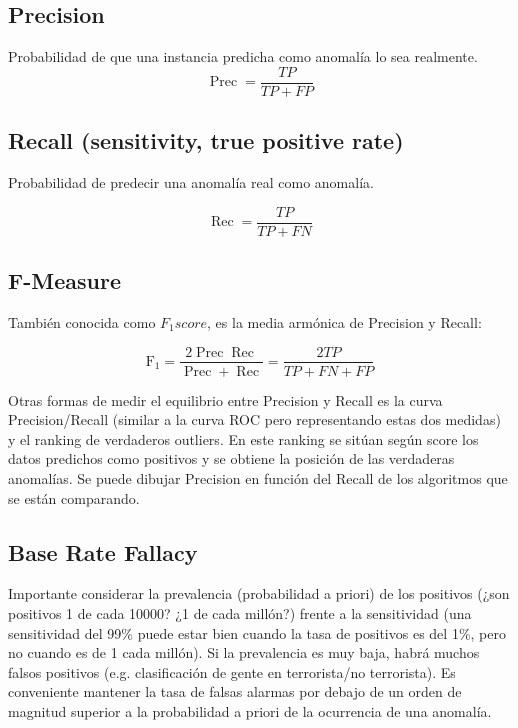 \documentclass[a4paper,11pt,spanish]{report}
\let\stdsub\subsection
\let\stdsubsub\subsubsection
\renewcommand{\section}{\stdsub}
\renewcommand{\subsection}{\stdsubsub}
\begin{document}
\section{Precision}
\label{sec-2-5-1}

Probabilidad de que una instancia predicha como anomalía lo sea realmente.
$$\operatorname{Prec}=\frac{TP}{TP+FP}$$

\section{Recall (sensitivity, true positive rate)}
\label{sec-2-5-2}

Probabilidad de predecir una anomalía real como anomalía.

$$\operatorname{Rec}=\frac{TP}{TP + FN}$$

\section{F-Measure}
\label{sec-2-5-3}

También conocida como $F_1 score$, es la media armónica de Precision y Recall:

$$\operatorname{F_1}=\frac{2 \operatorname{Prec} \operatorname{Rec}}{\operatorname{Prec} +\operatorname{Rec}} = \frac{2 TP}{TP + FN + FP}$$

Otras formas de medir el equilibrio entre Precision y Recall es la curva Precision/Recall (similar a la curva ROC pero representando estas dos medidas) y el ranking de verdaderos outliers. En este ranking se sitúan según score los datos predichos como positivos y se obtiene la posición de las verdaderas anomalías. Se puede dibujar Precision en función del Recall de los algoritmos que se están comparando.

\section{Base Rate Fallacy}
\label{sec-2-5-4}

Importante considerar la prevalencia (probabilidad a priori) de los positivos (¿son positivos 1 de cada 10000? ¿1 de cada millón?) frente a la sensitividad (una sensitividad del 99\% puede estar bien cuando la tasa de positivos es del 1\%, pero no cuando es de 1 cada millón). Si la prevalencia es muy baja, habrá muchos falsos positivos (e.g. clasificación de gente en terrorista/no terrorista). Es conveniente mantener la tasa de falsas alarmas por debajo de un orden de magnitud superior a la probabilidad a priori de la ocurrencia de una anomalía.
\end{document}
